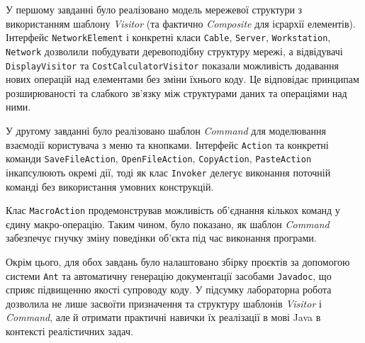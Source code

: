\documentclass[12pt,a4paper]{article}
\begin{document}
У першому завданні було реалізовано модель мережевої структури з використанням
шаблону \textit{Visitor} (та фактично \textit{Composite} для ієрархії елементів).
Інтерфейс \texttt{NetworkElement} і конкретні класи \texttt{Cable},
\texttt{Server}, \texttt{Workstation}, \texttt{Network} дозволили побудувати
деревоподібну структуру мережі, а відвідувачі \texttt{DisplayVisitor} та
\texttt{CostCalculatorVisitor} показали можливість додавання нових операцій над
елементами без зміни їхнього коду. Це відповідає принципам розширюваності та
слабкого зв’язку між структурами даних та операціями над ними.

У другому завданні було реалізовано шаблон \textit{Command} для моделювання
взаємодії користувача з меню та кнопками. Інтерфейс \texttt{Action} та
конкретні команди \texttt{SaveFileAction}, \texttt{OpenFileAction},
\texttt{CopyAction}, \texttt{PasteAction} інкапсулюють окремі дії, тоді як
клас \texttt{Invoker} делегує виконання поточній команді без використання
умовних конструкцій.

Клас \texttt{MacroAction} продемонстрував можливість
об’єднання кількох команд у єдину макро-операцію. Таким чином, було показано,
як шаблон \textit{Command} забезпечує гнучку зміну поведінки об’єкта під час
виконання програми.

Окрім цього, для обох завдань було налаштовано збірку проєктів за допомогою
системи \texttt{Ant} та автоматичну генерацію документації засобами
\texttt{Javadoc}, що сприяє підвищенню якості супроводу коду. У підсумку
лабораторна робота дозволила не лише засвоїти призначення та структуру
шаблонів \textit{Visitor} і \textit{Command}, але й отримати практичні навички
їх реалізації в мові Java в контексті реалістичних задач.
\end{document}
